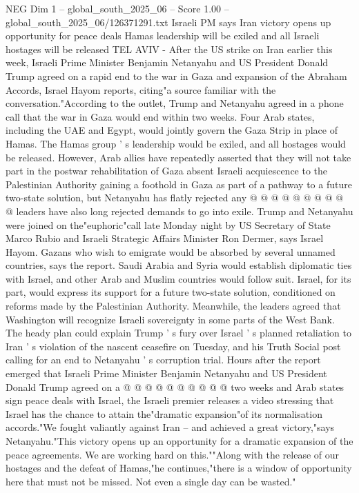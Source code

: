 \begin{textsample}{NEG Dim 1 – global\_south\_2025\_06 – Score 1.00 – global\_south\_2025\_06/126371291.txt}  \label{ex:f1_neg_316}
Israeli PM says Iran victory opens up opportunity for peace deals Hamas leadership will be exiled and all Israeli hostages will be released TEL AVIV - After the US strike on Iran earlier this week, Israeli Prime Minister Benjamin Netanyahu and US President Donald Trump agreed on a rapid end to the war in Gaza and expansion of the Abraham Accords, Israel Hayom reports, citing"a source familiar with the conversation."According to the outlet, Trump and Netanyahu agreed in a phone call that the war in Gaza would end within two weeks.
Four Arab states, including the UAE and Egypt, would jointly govern the Gaza Strip in place of Hamas.
The Hamas group ' s leadership would be exiled, and all hostages would be released.
However, Arab allies have repeatedly asserted that they will not take part in the postwar rehabilitation of Gaza absent Israeli acquiescence to the Palestinian Authority gaining a foothold in Gaza as part of a pathway to a future two-state solution, but Netanyahu has flatly rejected any @ @ @ @ @ @ @ @ @ @ leaders have also long rejected demands to go into exile.
Trump and Netanyahu were joined on the"euphoric"call late Monday night by US Secretary of State Marco Rubio and Israeli Strategic Affairs Minister Ron Dermer, says Israel Hayom.
Gazans who wish to emigrate would be absorbed by several unnamed countries, says the report.
Saudi Arabia and Syria would establish diplomatic ties with Israel, and other Arab and Muslim countries would follow suit.
Israel, for its part, would express its support for a future two-state solution, conditioned on reforms made by the Palestinian Authority.
Meanwhile, the leaders agreed that Washington will recognize Israeli sovereignty in some parts of the West Bank.
The heady plan could explain Trump ' s fury over Israel ' s planned retaliation to Iran ' s violation of the nascent ceasefire on Tuesday, and his Truth Social post calling for an end to Netanyahu ' s corruption trial.
Hours after the report emerged that Israeli Prime Minister Benjamin Netanyahu and US President Donald Trump agreed on a @ @ @ @ @ @ @ @ @ @ two weeks and Arab states sign peace deals with Israel, the Israeli premier releases a video stressing that Israel has the chance to attain the"dramatic expansion"of its normalisation accords."We fought valiantly against Iran -- and achieved a great victory,"says Netanyahu."This victory opens up an opportunity for a dramatic expansion of the peace agreements.
We are working hard on this.""Along with the release of our hostages and the defeat of Hamas,"he continues,"there is a window of opportunity here that must not be missed.
Not even a single day can be wasted."

\end{textsample}
